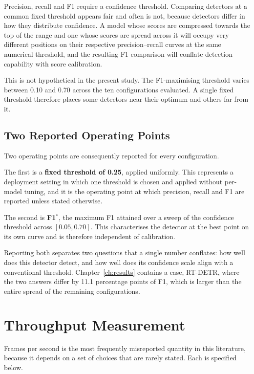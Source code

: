 \documentclass[MScCS]{uccthesis}
\begin{document}
Precision, recall and F1 require a confidence threshold. Comparing detectors at
a common fixed threshold appears fair and often is not, because detectors
differ in how they distribute confidence. A model whose scores are compressed
towards the top of the range and one whose scores are spread across it will
occupy very different positions on their respective precision--recall curves at
the same numerical threshold, and the resulting F1 comparison will conflate
detection capability with score calibration.

This is not hypothetical in the present study. The F1-maximising threshold
varies between 0.10 and 0.70 across the ten configurations evaluated. A single
fixed threshold therefore places some detectors near their optimum and others
far from it.

\subsection{Two Reported Operating Points}

Two operating points are consequently reported for every configuration.

The first is a \textbf{fixed threshold of 0.25}, applied uniformly. This
represents a deployment setting in which one threshold is chosen and applied
without per-model tuning, and it is the operating point at which precision,
recall and F1 are reported unless stated otherwise.

The second is \textbf{F1$^{\ast}$}, the maximum F1 attained over a sweep of the
confidence threshold across $[0.05, 0.70]$. This characterises the detector at
the best point on its own curve and is therefore independent of calibration.

Reporting both separates two questions that a single number conflates: how well
does this detector detect, and how well does its confidence scale align with a
conventional threshold. Chapter~\ref{ch:results} contains a case, RT-DETR, where the two answers differ by 11.1 percentage points of F1, which
is larger than the entire spread of the remaining configurations.

\section{Throughput Measurement}
\label{sec:throughput}

Frames per second is the most frequently misreported quantity in this
literature, because it depends on a set of choices that are rarely stated. Each
is specified below.
\end{document}
